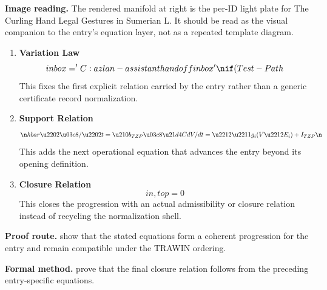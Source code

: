 \begin{samepage}
\noindent\begin{minipage}[t]{0.45\linewidth}
\vspace{0pt}
\raggedright
\scriptsize\textbf{Image reading.} The rendered manifold at right is the per-ID light plate for The Curling Hand Legal Gestures in Sumerian L. It should be read as the visual companion to the entry's equation layer, not as a repeated template diagram.\par
\end{minipage}\hfill
\begin{minipage}[t]{0.53\linewidth}
\vspace*{-0.10in}
\raggedright
{}
\end{minipage}
\end{samepage}

\clearpage


\begin{enumerate}[leftmargin=1.6em,itemsep=9pt,topsep=6pt]
\item \textbf{Variation Law}
\[
inbox='C:\\azlan-assistant\\handoff\\inbox'\nif (Test-Path
\]
This fixes the first explicit relation carried by the entry rather than a generic certificate record normalization.

\item \textbf{Support Relation}
\[
\n \\hbar \u2202\u03c8/\u2202t = \u210b_{TZP} \u03c8 \u21d4 C dV/dt = \u2212\u2211g_i(V\u2212E_i)+I_{TZP}\n \
\]
This adds the next operational equation that advances the entry beyond its opening definition.

\item \textbf{Closure Relation}
\[
in,top=0
\]
This closes the progression with an actual admissibility or closure relation instead of recycling the normalization shell.
\end{enumerate}

\textbf{Proof route.} show that the stated equations form a coherent progression for the entry and remain compatible under the TRAWIN ordering.

\textbf{Formal method.} prove that the final closure relation follows from the preceding entry-specific equations.

